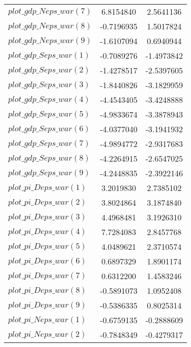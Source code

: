 \begin{center}
\begin{longtable}{lcc}
$plot\_gdp\_N eps\_war (7)  $	 & 	      6.8154840	 & 	      2.5641136 \\ 
$plot\_gdp\_N eps\_war (8)  $	 & 	     -0.7196935	 & 	      1.5017824 \\ 
$plot\_gdp\_N eps\_war (9)  $	 & 	     -1.6107094	 & 	      0.6940944 \\ 
$plot\_gdp\_S eps\_war (1)  $	 & 	     -0.7089276	 & 	     -1.4973842 \\ 
$plot\_gdp\_S eps\_war (2)  $	 & 	     -1.4278517	 & 	     -2.5397605 \\ 
$plot\_gdp\_S eps\_war (3)  $	 & 	     -1.8440826	 & 	     -3.1829959 \\ 
$plot\_gdp\_S eps\_war (4)  $	 & 	     -4.4543405	 & 	     -3.4248888 \\ 
$plot\_gdp\_S eps\_war (5)  $	 & 	     -4.9833674	 & 	     -3.3878943 \\ 
$plot\_gdp\_S eps\_war (6)  $	 & 	     -4.0377040	 & 	     -3.1941932 \\ 
$plot\_gdp\_S eps\_war (7)  $	 & 	     -4.9894772	 & 	     -2.9317683 \\ 
$plot\_gdp\_S eps\_war (8)  $	 & 	     -4.2264915	 & 	     -2.6547025 \\ 
$plot\_gdp\_S eps\_war (9)  $	 & 	     -4.2448835	 & 	     -2.3922146 \\ 
$plot\_pi\_D eps\_war (1)   $	 & 	      3.2019830	 & 	      2.7385102 \\ 
$plot\_pi\_D eps\_war (2)   $	 & 	      3.8024864	 & 	      3.1874840 \\ 
$plot\_pi\_D eps\_war (3)   $	 & 	      4.4968481	 & 	      3.1926310 \\ 
$plot\_pi\_D eps\_war (4)   $	 & 	      7.7284083	 & 	      2.8457768 \\ 
$plot\_pi\_D eps\_war (5)   $	 & 	      4.0489621	 & 	      2.3710574 \\ 
$plot\_pi\_D eps\_war (6)   $	 & 	      0.6897329	 & 	      1.8901174 \\ 
$plot\_pi\_D eps\_war (7)   $	 & 	      0.6312200	 & 	      1.4583246 \\ 
$plot\_pi\_D eps\_war (8)   $	 & 	     -0.5891073	 & 	      1.0952408 \\ 
$plot\_pi\_D eps\_war (9)   $	 & 	     -0.5386335	 & 	      0.8025314 \\ 
$plot\_pi\_N eps\_war (1)   $	 & 	     -0.6759135	 & 	     -0.2888609 \\ 
$plot\_pi\_N eps\_war (2)   $	 & 	     -0.7848349	 & 	     -0.4279317 \\ 

\end{longtable}
\end{center}
